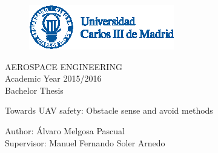 \begin{titlepage}

\begin{center}

\begin{figure}[t!]
\begin{center}
\includegraphics[width=0.75\columnwidth]{../figures/logoUC3M.eps} 
\end{center}
\end{figure}
\vspace{5cm}
{\large AEROSPACE ENGINEERING}\\
\vspace{1cm}
Academic Year 2015/2016\\
Bachelor Thesis
\vspace{3cm}

{\Huge Towards UAV safety: Obstacle sense and avoid methods}\\

\vspace{8cm}


Author: \'Alvaro Melgosa Pascual\\
Supervisor: Manuel Fernando Soler Arnedo


\end{center}


\end{titlepage}
